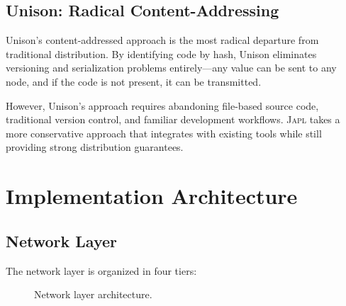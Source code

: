 \documentclass[11pt,a4paper]{article}
\newcommand{\japl}{\textsc{Japl}}
\newcommand{\node}{\textsf{Node}}
\begin{document}
\subsection{Unison: Radical Content-Addressing}

Unison's content-addressed approach is the most radical departure from
traditional distribution. By identifying code by hash, Unison eliminates
versioning and serialization problems entirely---any value can be sent
to any node, and if the code is not present, it can be transmitted.

However, Unison's approach requires abandoning file-based source code,
traditional version control, and familiar development workflows. \japl{}
takes a more conservative approach that integrates with existing tools
while still providing strong distribution guarantees.


\section{Implementation Architecture}
\label{sec:implementation}

\subsection{Network Layer}

The network layer is organized in four tiers:

\begin{figure}[H]
\centering
{}
\caption{Network layer architecture.}
\label{fig:network-layers}
\end{figure}
\end{document}
